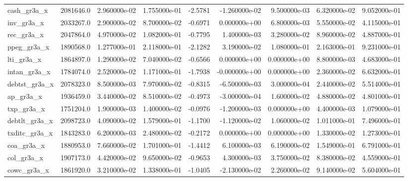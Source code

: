 \documentclass[10pt]{article}
\begin{document}
\begin{landscape}
\begin{longtable}{|l|r|r|r|r|r|r|r|r|}
cash\_gr3a\_x             &  2081646.0 &  2.960000e-02 &  1.755000e-01 &     -2.5781 & -1.260000e-02 &  9.500000e-03 &  6.320000e-02 &  9.052000e-01 \\
inv\_gr3a\_x              &  2033267.0 &  2.900000e-02 &  8.700000e-02 &     -0.6971 &  0.000000e+00 &  6.800000e-03 &  5.550000e-02 &  4.115000e-01 \\
rec\_gr3a\_x              &  2047864.0 &  4.970000e-02 &  1.082000e-01 &     -0.7795 &  1.400000e-03 &  3.280000e-02 &  8.960000e-02 &  4.887000e-01 \\
ppeg\_gr3a\_x             &  1890568.0 &  1.277000e-01 &  2.118000e-01 &     -2.1282 &  3.190000e-02 &  1.080000e-01 &  2.163000e-01 &  9.231000e-01 \\
lti\_gr3a\_x              &  1864897.0 &  1.290000e-02 &  7.040000e-02 &     -0.6566 &  0.000000e+00 &  0.000000e+00 &  8.800000e-03 &  4.683000e-01 \\
intan\_gr3a\_x            &  1784074.0 &  2.520000e-02 &  1.171000e-01 &     -1.7938 & -0.000000e+00 &  0.000000e+00 &  2.360000e-02 &  6.632000e-01 \\
debtst\_gr3a\_x           &  2078323.0 &  8.500000e-03 &  7.970000e-02 &     -0.8315 & -6.500000e-03 &  3.000000e-04 &  2.440000e-02 &  5.514000e-01 \\
ap\_gr3a\_x               &  1936459.0 &  3.440000e-02 &  8.510000e-02 &     -0.4973 & -3.000000e-04 &  1.600000e-02 &  4.880000e-02 &  4.801000e-01 \\
txp\_gr3a\_x              &  1751204.0 &  1.900000e-03 &  1.400000e-02 &     -0.0976 & -1.200000e-03 &  0.000000e+00 &  4.400000e-03 &  1.079000e-01 \\
debtlt\_gr3a\_x           &  2098723.0 &  4.090000e-02 &  1.579000e-01 &     -1.1700 & -1.120000e-02 &  1.060000e-02 &  1.011000e-01 &  7.496000e-01 \\
txditc\_gr3a\_x           &  1843283.0 &  6.200000e-03 &  2.480000e-02 &     -0.2172 &  0.000000e+00 &  0.000000e+00 &  1.330000e-02 &  1.273000e-01 \\
coa\_gr3a\_x              &  1880953.0 &  7.660000e-02 &  1.701000e-01 &     -1.4412 &  6.100000e-03 &  6.190000e-02 &  1.549000e-01 &  6.791000e-01 \\
col\_gr3a\_x              &  1907173.0 &  4.420000e-02 &  9.650000e-02 &     -0.9653 &  4.300000e-03 &  3.750000e-02 &  8.380000e-02 &  4.559000e-01 \\
cowc\_gr3a\_x             &  1861920.0 &  3.210000e-02 &  1.338000e-01 &     -1.0405 & -2.130000e-02 &  2.260000e-02 &  9.140000e-02 &  5.604000e-01 \\

\end{longtable}
\end{landscape}
\end{document}
